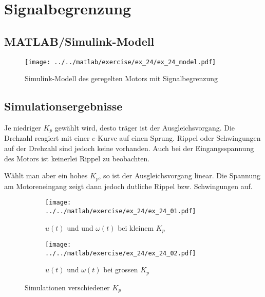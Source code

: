 \section{Signalbegrenzung}

\subsection{MATLAB/Simulink-Modell}

\begin{figure}[h!]
	\centering
	\texttt{[image: ../../matlab/exercise/ex\_24/ex\_24\_model.pdf]}
	\caption{Simulink-Modell des geregelten Motors mit Signalbegrenzung}
\end{figure}

\subsection{Simulationsergebnisse}
Je niedriger $K_p$ gewählt wird, desto träger ist der Ausgleichsvorgang.
Die Drehzahl reagiert mit einer $e$-Kurve auf einen Sprung. Rippel oder
Schwingungen auf der Drehzahl sind jedoch keine vorhanden. Auch bei der
Eingangsspannung des Motors ist keinerlei Rippel zu beobachten.

Wählt man aber ein hohes $K_p$, so ist der Ausgleichsvorgang linear. Die
Spannung am Motoreneingang zeigt dann jedoch dutliche Rippel bzw.
Schwingungen auf.

\begin{figure}[h!]
	\centering
	\begin{subfigure}{0.45\textwidth}
		\texttt{[image: ../../matlab/exercise/ex\_24/ex\_24\_01.pdf]}
		\caption{$u(t)$ und und $\omega(t)$ bei kleinem $K_p$}
	\end{subfigure}
	\hfill{}
	\begin{subfigure}{0.45\textwidth}
		\texttt{[image: ../../matlab/exercise/ex\_24/ex\_24\_02.pdf]}
		\caption{$u(t)$ und $\omega(t)$ bei grossen $K_p$}
	\end{subfigure}
	\caption{Simulationen verschiedener $K_p$}
\end{figure}

